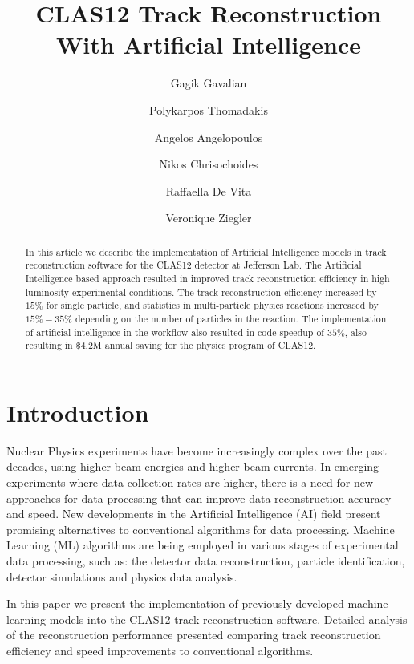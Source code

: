 \documentclass[preprint,12pt]{elsarticle}
\title{CLAS12 Track Reconstruction With Artificial Intelligence }
\author[1]{Gagik Gavalian}
\author[2]{Polykarpos Thomadakis}
\author[2]{Angelos Angelopoulos}
\author[2]{Nikos Chrisochoides}
\author[3]{Raffaella De Vita}
\author[1]{Veronique Ziegler}
\begin{document}
\begin{abstract}

  In this article we describe the implementation of Artificial Intelligence models in track reconstruction software for the CLAS12 detector at Jefferson Lab.
 The Artificial Intelligence based approach resulted in improved track reconstruction efficiency in high luminosity experimental conditions.  The track
 reconstruction efficiency increased by $15\%$ for single particle, and statistics in multi-particle physics reactions increased by $15\%-35\%$ depending 
 on the number of particles in the reaction. The implementation of artificial intelligence in the workflow also resulted in code speedup of $35\%$, also resulting in $\$4.2$M  annual saving for the physics program of CLAS12.
\end{abstract}
\maketitle


\section{Introduction}
\indent

Nuclear Physics experiments have become increasingly complex over the past decades, using higher beam energies and higher beam currents. In emerging experiments where data collection rates are higher, there is a need for new approaches for data processing that can improve data reconstruction accuracy and speed. New developments in the Artificial Intelligence (AI) field present promising alternatives to conventional algorithms for data processing. Machine Learning (ML) algorithms are being employed in various stages of experimental data processing, such as: the detector data reconstruction, particle identification, detector simulations and physics data analysis. 

In this paper we present the implementation of previously developed machine learning models into the CLAS12 track reconstruction software. Detailed analysis 
of the reconstruction performance presented comparing track reconstruction efficiency and speed improvements to conventional algorithms.







\end{document}

